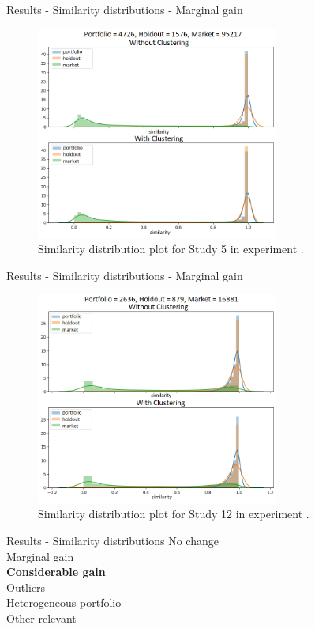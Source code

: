 
\begin{frame}{Results - Similarity distributions - Marginal gain}
    \begin{figure}
        \centering
        \includegraphics[width=8cm]{fig/ch4-study-5-marginal-increase-exp-2.png}
        \caption{Similarity distribution plot for Study 5 in experiment \nameExperimentII{}.}
    \end{figure}
\end{frame}


\begin{frame}{Results - Similarity distributions - Marginal gain}
    \begin{figure}
        \centering
        \includegraphics[width=8cm]{fig/ch4-study-12-marginal-decrease-exp-1.png}
        \caption{Similarity distribution plot for Study 12 in experiment \nameExperimentI{}.}
    \end{figure}
\end{frame}


\begin{frame}{Results - Similarity distributions}
    No change \\ 
    \vspace{0.5cm}
    Marginal gain \\
    \vspace{0.5cm}
    \textbf{Considerable gain} \\
    \vspace{0.5cm}
    Outliers \\
    \vspace{0.5cm}
    Heterogeneous portfolio \\
    \vspace{0.5cm}
    Other relevant 
\end{frame}

